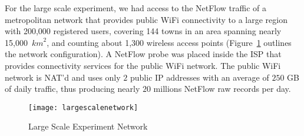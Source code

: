 \documentclass[10pt,conference,compsocconf,letterpaper]{IEEEtran}
\begin{document}
For the large scale experiment, we had access to the NetFlow traffic
of a metropolitan network that provides public WiFi
connectivity to a large region with 200,000 registered users, covering 144 towns in an area spanning 
nearly 15,000~$\textit{km}^2$, and counting about 1,300 wireless access points 
(Figure~\ref{fig:largescalenetwork} outlines the network configuration).
A NetFlow probe was placed inside the ISP that provides connectivity services 
for the public WiFi network. The public WiFi network is NAT'd and uses only $2$ public IP addresses
with an average of $250$ GB of daily traffic, thus producing nearly $20$ millions
NetFlow raw records per day. 
\begin{figure}	
    \centering    
    \texttt{[image: largescalenetwork]}
    \caption{Large Scale Experiment Network}
\label{fig:largescalenetwork}
\end{figure}
\end{document}
